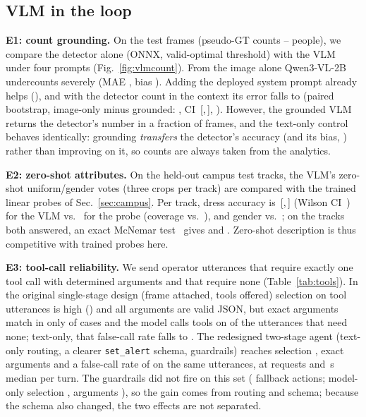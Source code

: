 \documentclass[conference]{IEEEtran}
\newcommand{\ci}[2]{\,[#1,\,#2]}
\begin{document}
\subsection{VLM in the loop}
\label{sec:vlm}
\ifHaveVLMEOne
\textbf{E1: count grounding.} On the \EoFrames{} test frames (pseudo-GT counts \EoGtMin--\EoGtMax{} people), we
compare the detector alone (ONNX, valid-optimal threshold) with the VLM under four prompts
(Fig.~\ref{fig:vlmcount}). From the image alone Qwen3-VL-2B undercounts severely
(MAE \EoMaeB, bias \EoBiasB). Adding the deployed system prompt already helps (\EoMaeBsys), and with the detector
count in the context its error falls to \EoMaeC{} (paired bootstrap, image-only minus grounded: \EoDeltaBC,
CI \ci{\EoDeltaLoBC}{\EoDeltaHiBC}, \EoPvalBC). However, the grounded VLM returns the detector's number in a
fraction \EoCopyC{} of frames, and the text-only control behaves identically: grounding \emph{transfers} the
detector's accuracy (and its bias, \EoBiasA) rather than improving on it, so counts are always taken from the
analytics.
\fi

\ifHaveVLMETwo
\textbf{E2: zero-shot attributes.} On the held-out campus test tracks, the VLM's zero-shot uniform/gender votes
(three crops per track) are compared with the trained linear probes of Sec.~\ref{sec:campus}. Per track,
dress accuracy is \EtVlmAccUni{} \ci{\EtVlmLoUni}{\EtVlmHiUni} (Wilson CI~\cite{wilson1927}) for the VLM vs.\ \EtProbeAccUni{} for the probe
(coverage \EtVlmCovUni{} vs.\ \EtProbeCovUni), and gender \EtVlmAccGen{} vs.\ \EtProbeAccGen; on the tracks both
answered, an exact McNemar test~\cite{mcnemar1947} gives \EtMcPUni{} and \EtMcPGen. Zero-shot description is thus
competitive with trained probes here.
\fi

\ifHaveVLMEThree
\textbf{E3: tool-call reliability.} We send \EthNTool{} operator utterances that require exactly one tool call
with determined arguments and \EthNNoTool{} that require none (Table~\ref{tab:tools}). In the original
single-stage design (frame attached, tools offered) selection on tool utterances is high (\EthSelToolFrame) and
all arguments are valid JSON, but exact arguments match in only \EthArgFrame{} of cases and the model calls tools
on \EthFpFrame{} of the utterances that need none; text-only, that false-call rate falls to \EthFpText.
\ifHaveVLMEThreeB
The redesigned two-stage agent (text-only routing, a clearer \texttt{set\_alert} schema, guardrails) reaches
selection \EtbSel, exact arguments \EtbArg{} and a false-call rate of \EtbFp{} on the same utterances, at
\EtbReq{} requests and \EtbLat\,s median per turn. The guardrails did not fire on this set (\EtbFallback{}
fallback actions; model-only selection \EtbMoSel, arguments \EtbMoArg), so the gain comes from routing and schema;
because the schema also changed, the two effects are not separated.
\fi
\fi
\end{document}
